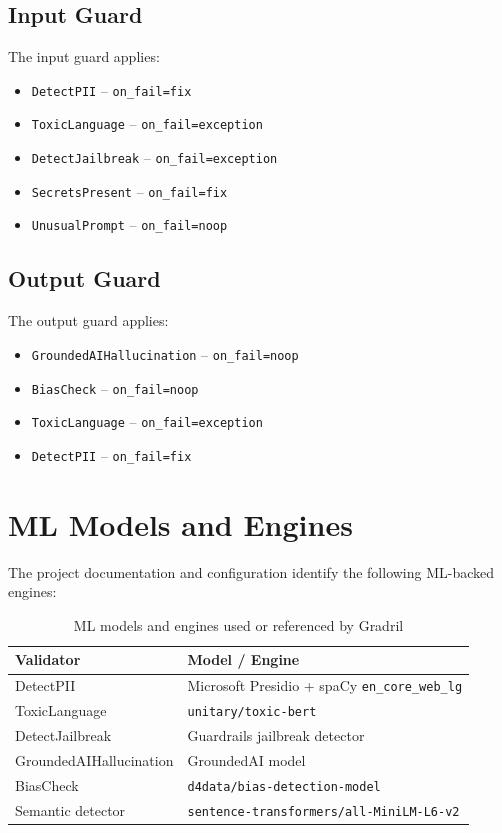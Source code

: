 \documentclass[journal]{IEEEtran}
\begin{document}
\subsection{Input Guard}
The input guard applies:
\begin{itemize}
    \item \texttt{DetectPII} -- \texttt{on\_fail=fix}
    \item \texttt{ToxicLanguage} -- \texttt{on\_fail=exception}
    \item \texttt{DetectJailbreak} -- \texttt{on\_fail=exception}
    \item \texttt{SecretsPresent} -- \texttt{on\_fail=fix}
    \item \texttt{UnusualPrompt} -- \texttt{on\_fail=noop}
\end{itemize}

\subsection{Output Guard}
The output guard applies:
\begin{itemize}
    \item \texttt{GroundedAIHallucination} -- \texttt{on\_fail=noop}
    \item \texttt{BiasCheck} -- \texttt{on\_fail=noop}
    \item \texttt{ToxicLanguage} -- \texttt{on\_fail=exception}
    \item \texttt{DetectPII} -- \texttt{on\_fail=fix}
\end{itemize}

\section{ML Models and Engines}
The project documentation and configuration identify the following ML-backed engines:
\begin{table}[ht]
\centering
\caption{ML models and engines used or referenced by Gradril}
\begin{tabular}{p{2.2cm}p{4.4cm}}
\toprule
\textbf{Validator} & \textbf{Model / Engine} \\ \midrule
DetectPII & Microsoft Presidio + spaCy \texttt{en\_core\_web\_lg} \\
ToxicLanguage & \texttt{unitary/toxic-bert} \\
DetectJailbreak & Guardrails jailbreak detector \\
GroundedAIHallucination & GroundedAI model \\
BiasCheck & \texttt{d4data/bias-detection-model} \\
Semantic detector & \texttt{sentence-transformers/all-MiniLM-L6-v2} \\ \bottomrule
\end{tabular}
\end{table}
\end{document}

